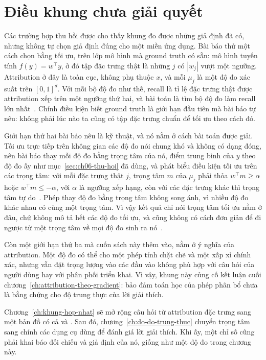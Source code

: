 \section{Điều khung chưa giải quyết}
\label{sec:ch06-dieu-chua-giai-quyet}

%
%
Các trường hợp thu hồi được cho thấy khung đo được những giả định đã có, nhưng
không tự chọn giả định đúng cho một miền ứng dụng. Bài báo thử một cách chọn
bằng tối ưu, trên lớp mô hình mà ground truth có sẵn: mô hình tuyến tính
$f(y)=w^{\top}y$, ở đó tập đặc trưng thật là những $j$ có $|w_j|$ vượt một
ngưỡng. Attribution ở đây là toàn cục, không phụ thuộc $x$, và mỗi
 $\mu_j$ là một độ đo xác suất trên $[0,1]^d$. Với mỗi bộ
độ đo như thế, recall là tỉ lệ đặc trưng thật được attribution xếp trên một
ngưỡng thứ hai, và bài toán là tìm bộ độ đo làm recall lớn
nhất~\autocite{p17firstprinciples}. Chính điều kiện biết ground truth là giới
hạn đầu tiên mà bài báo tự nêu: không phải lúc nào ta cũng có tập đặc trưng
chuẩn để tối ưu theo cách đó.

Giới hạn thứ hai bài báo nêu là kỹ thuật, và nó nằm ở cách bài toán được giải.
Tối ưu trực tiếp trên không gian các độ đo nói chung khó và không có dạng
đóng, nên bài báo thay mỗi độ đo bằng trọng tâm của nó, điểm trung bình của
$y$ theo độ đo ấy như mục~\ref{sec:ch06-thu-hoi} đã dùng, và phát biểu điều
kiện tối ưu trên các trọng tâm: với mỗi đặc trưng thật $j$, trọng tâm $m$ của
$\mu_j$ phải thỏa $w^{\top}m\ge\alpha$ hoặc $w^{\top}m\le-\alpha$, với
$\alpha$ là ngưỡng xếp hạng, còn với các đặc trưng khác thì trọng tâm tự
do~\autocite{p17firstprinciples}. Phép thay độ đo bằng trọng tâm không song
ánh, vì nhiều độ đo khác nhau có cùng một trọng tâm. Vì vậy kết quả chỉ nói
trọng tâm tối ưu nằm ở đâu, chứ không mô tả hết các độ đo tối ưu, và cũng
không có cách đơn giản để đi ngược từ một trọng tâm về mọi độ đo sinh ra
nó~\autocite{p17firstprinciples}.

Còn một giới hạn thứ ba mà cuốn sách này thêm vào, nằm ở ý nghĩa của
attribution. Một độ đo có thể cho một phép tính chặt chẽ và một xấp xỉ chính
xác, nhưng vẫn đặt trọng lượng vào các đầu vào không phù hợp với câu hỏi của
người dùng hay với phân phối triển khai.
Vì vậy, khung này củng cố kết luận cuối chương~\ref{ch:attribution-theo-gradient}:
bảo đảm toán học của phép phân bổ chưa là bằng chứng cho độ trung thực của lời
giải thích.

Chương~\ref{ch:khung-hop-nhat} sẽ mở rộng câu hỏi từ attribution đặc trưng sang
một bản đồ có cả  và
. Sau đó, chương~\ref{ch:do-do-trung-thuc} chuyển trọng tâm sang chính các dụng cụ dùng để đánh
giá lời giải thích. Khi ấy, một chỉ số cũng phải khai báo đối chiếu và giả định
của nó, giống như một độ đo trong chương này.

%
